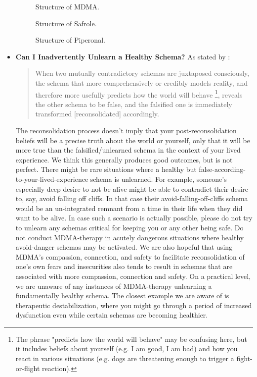 \documentclass[12pt,letterpaper]{book}
\begin{document}
\begin{itemize}
        \FloatBarrier
        \begin{figure}[htbp]
            \centering
            \caption{Structure of MDMA.}
            \label{fig:mdma}
        \end{figure}
        \begin{figure}[htbp]
            \centering
            \caption{Structure of Safrole.}
            \label{fig:safrole}
        \end{figure}
        \begin{figure}[htbp]
            \centering
            \caption{Structure of Piperonal.}
            \label{fig:piperonal}
        \end{figure}
        \FloatBarrier
    \item \textbf{Can I Inadvertently Unlearn a Healthy Schema?}
        As stated by \textcite{ecker2015misunderstood}:
        \begin{quotation}
         When two mutually contradictory schemas are juxtaposed consciously, the schema that more comprehensively or credibly models reality, and therefore more usefully predicts how the world will behave \footnote{The phrase "predicts how the world will behave" may be confusing here, but it includes beliefs about yourself (e.g. I am good, I am bad) and how you react in various situations (e.g. dogs are threatening enough to trigger a fight-or-flight reaction).}, reveals the other schema to be false, and the falsified one is immediately transformed [reconsolidated] accordingly.
        \end{quotation}
        The reconsolidation process doesn't imply that your post-reconsolidation beliefs will be a precise truth about the world or yourself, only that it will be more true than the falsified/unlearned schema in the context of your lived experience. We think this generally produces good outcomes, but is not perfect. There might be rare situations where a healthy but false-according-to-your-lived-experience schema is unlearned. For example, someone's especially deep desire to not be alive might be able to contradict their desire to, say, avoid falling off cliffs. In that case their avoid-falling-off-cliffs schema would be an un-integrated remnant from a time in their life when they did want to be alive. In case such a scenario is actually possible, please do not try to unlearn any schemas critical for keeping you or any other being safe. Do not conduct MDMA-therapy in acutely dangerous situations where healthy avoid-danger schemas may be activated. We are also hopeful that using MDMA's compassion, connection, and safety to facilitate reconsolidation of one's own fears and insecurities also tends to result in schemas that are associated with more compassion, connection and safety. On a practical level, we are unaware of any instances of MDMA-therapy unlearning a fundamentally healthy schema. The closest example we are aware of is therapeutic destabilization, where you might go through a period of increased dysfunction even while certain schemas are becoming healthier.
        

\end{itemize}
\end{document}
